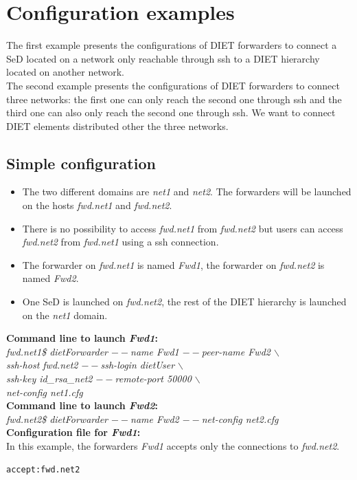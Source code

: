 \section{Configuration examples}
\label{sec:ForwarderExamples}
The first example presents the configurations of DIET forwarders to
connect a SeD located on a network only reachable through ssh to a
DIET hierarchy located on another network.\\

The second example presents the configurations of DIET forwarders to
connect three networks: the first one can only reach the second one
through ssh and the third one can also only reach the second one
through ssh. We want to connect DIET elements distributed other the
three networks.
\subsection{Simple configuration}
\begin{itemize}
\item The two different domains are \textit{net1} and \textit{net2}. The forwarders will
  be launched on the hosts \textit{fwd.net1} and \textit{fwd.net2}.
\item There is no possibility to access \textit{fwd.net1} from
  \textit{fwd.net2} but users can access \textit{fwd.net2} from
  \textit{fwd.net1} using a ssh connection.
\item The forwarder on \textit{fwd.net1} is named \textit{Fwd1}, the
  forwarder on \textit{fwd.net2} is named \textit{Fwd2}.
\item One SeD is launched on \textit{fwd.net2}, the rest of the DIET
  hierarchy is launched on the \textit{net1} domain.\\
\end{itemize}

\noindent\textbf{Command line to launch \textit{Fwd1}: }\\
{\small \it fwd.net1\$ dietForwarder {\tiny$--$}name Fwd1
  {\tiny$--$}peer-name Fwd2 $\backslash$\\
  \hspace*{4.2cm}{\tiny$--$}ssh-host fwd.net2 {\tiny$--$}ssh-login
  dietUser $\backslash$\\
  \hspace*{4.2cm}{\tiny$--$}ssh-key id\_rsa\_net2
  {\tiny$--$}remote-port 50000 $\backslash$\\
  \hspace*{4.2cm}{\tiny$--$}net-config net1.cfg}\\[2mm]
\noindent\textbf{Command line to launch \textit{Fwd2}: }\\
{\small \it fwd.net2\$ dietForwarder {\tiny$--$}name Fwd2
  {\tiny$--$}net-config net2.cfg}\\[3mm]
\noindent\textbf{Configuration file for \textit{Fwd1}:}\\
In this example, the forwarders \textit{Fwd1} accepts only the
connections to \textit{fwd.net2}.
\begin{verbatim}
accept:fwd.net2
\end{verbatim}

